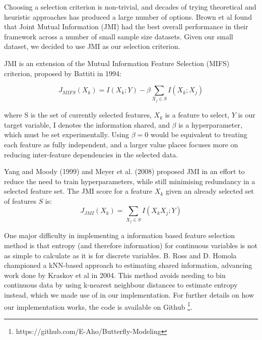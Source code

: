 \documentclass[prl,showpacs,superscriptaddress,twocolumn,longbibliography]{revtex4-1}
\begin{document}
Choosing a selection criterion is non-trivial, and decades of trying theoretical and heuristic approaches has produced a large number of options. Brown et al\cite{Brown2012} found that Joint Mutual Information (JMI)\cite{yang_data_1999} had the best overall performance in their framework across a number of small sample size datasets. Given our small dataset, we decided to use JMI as our selection criterion.

JMI is an extension of the Mutual Information Feature Selection (MIFS) criterion, proposed by Battiti in 1994:

\[ 
    J_{MIFS}(X_k) = I(X_k;Y) - \beta \sum_{X_j\in S} I(X_k;X_j)
\]

where S is the set of currently selected features, $X_k$ is a feature to select, $Y$ is our target variable, I denotes the information shared,  and $ \beta $ is a hyperparameter, which must be set experimentally. Using $\beta  = 0 $ would be equivalent to treating each feature as fully independent, and a larger value places focuses more on reducing inter-feature dependencies in the selected data. 

Yang and Moody (1999) and Meyer et al. (2008) proposed JMI in an effort to reduce the need to train hyperparameters, while still minimising redundancy in a selected feature set\cite{Brown2012}. The JMI score for a feature $X_k$ given an already selected set of features $S$ is:
\[ 
    J_{JMI}(X_k) =  \sum_{X_j\in S} I(X_kX_j;Y)
\]

One major difficulty in implementing a information based feature selection method is that entropy (and therefore information) for continuous variables is not as simple to calculate as it is for discrete variables. B. Ross\cite{Ross2014} and D. Homola \cite{Homola2016} championed a kNN-based approach to estimating shared information, advancing work done by Kraskov et al in 2004\cite{kraskov_estimating_2004}. This method avoids needing to bin continuous data by using k-nearest neighbour distances to estimate entropy instead, which we made use of in our implementation. For further details on how our implementation works, the code is available on Github \footnote{https://github.com/E-Aho/Butterfly-Modeling}.
\end{document}
